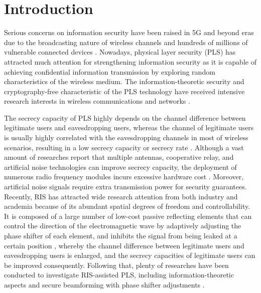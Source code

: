 \documentclass[journal]{IEEEtran}
\theoremstyle{definition}
\begin{document}
\section{Introduction}
Serious concerns on information security have been raised in 5G and beyond eras due to the broadcasting nature of wireless channels and hundreds of millions of vulnerable connected devices \cite{Ahmad2019}. Nowadays, physical layer security (PLS) has attracted much attention for strengthening information security as it is capable of achieving confidential information transmission by exploring random characteristics of the wireless medium. The information-theoretic security and cryptography-free characteristic of the PLS technology have received intensive research interests in wireless communications and networks \cite{Wu2019}.

The secrecy capacity of PLS highly depends on the channel difference between legitimate users and eavesdropping users, whereas the channel of legitimate users is usually highly correlated with the eavesdropping channels in most of wireless scenarios, resulting in a low secrecy capacity or secrecy rate \cite{Wu2019}. Although a vast amount of researches report that multiple antennas, cooperative relay, and artificial noise technologies can improve secrecy capacity, the deployment of numerous radio frequency modules incurs excessive hardware cost \cite{Liusurvey2017}. Moreover, artificial noise signals require extra transmission power for security guarantees. Recently, RIS has attracted wide research attention from both industry and academia because of its abundant spatial degrees of freedom and controllability. It is composed of a large number of low-cost passive reflecting elements that can control the direction of the electromagnetic wave by adaptively adjusting the phase shifter of each element, and inhibits the signal from being leaked at a certain position  \cite{Wuirs2019}, whereby the channel difference between legitimate users and eavesdropping users is enlarged, and the secrecy capacities of legitimate users can be improved consequently. Following that, plenty of researches have been conducted to investigate RIS-assisted PLS, including information-theoretic aspects \cite{Yang2020,Trigui2021,hong2020outage, Zhangtifs2021, hou2019mimo} and secure beamforming with phase shifter adjustments \cite{Miao2019, Hong2019, Qiao2020, Zheng2021,HongAN2020,HongRobust2021,Dong2020,Shu2021,Niu2021,  Yu2020,Elhoushy2021, Feng2020}. 
\end{document}

